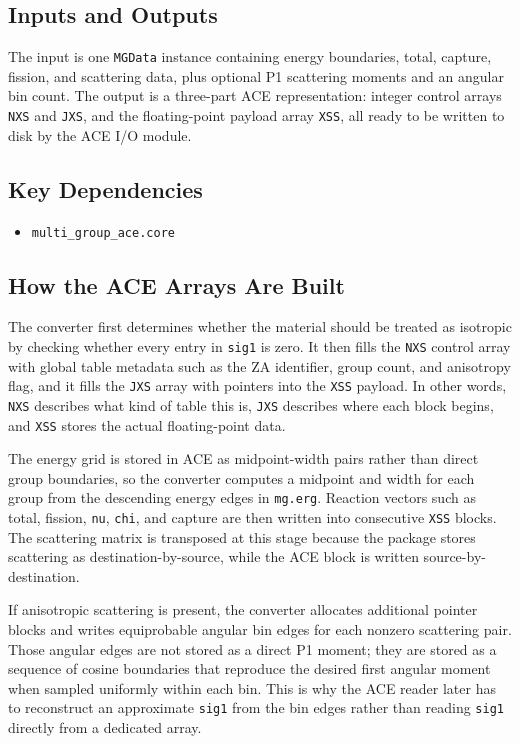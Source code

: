 \documentclass[11pt]{article}
\begin{document}
\subsection*{Inputs and Outputs}
The input is one \texttt{MGData} instance containing energy boundaries, total, capture, fission, and scattering data, plus optional P1 scattering moments and an angular bin count. The output is a three-part ACE representation: integer control arrays \texttt{NXS} and \texttt{JXS}, and the floating-point payload array \texttt{XSS}, all ready to be written to disk by the ACE I/O module.

\subsection*{Key Dependencies}
\begin{itemize}
\item \texttt{multi\_group\_ace.core}
\end{itemize}

\subsection*{How the ACE Arrays Are Built}
The converter first determines whether the material should be treated as isotropic by checking whether every entry in \texttt{sig1} is zero. It then fills the \texttt{NXS} control array with global table metadata such as the ZA identifier, group count, and anisotropy flag, and it fills the \texttt{JXS} array with pointers into the \texttt{XSS} payload. In other words, \texttt{NXS} describes what kind of table this is, \texttt{JXS} describes where each block begins, and \texttt{XSS} stores the actual floating-point data.

The energy grid is stored in ACE as midpoint-width pairs rather than direct group boundaries, so the converter computes a midpoint and width for each group from the descending energy edges in \texttt{mg.erg}. Reaction vectors such as total, fission, \texttt{nu}, \texttt{chi}, and capture are then written into consecutive \texttt{XSS} blocks. The scattering matrix is transposed at this stage because the package stores scattering as destination-by-source, while the ACE block is written source-by-destination.

If anisotropic scattering is present, the converter allocates additional pointer blocks and writes equiprobable angular bin edges for each nonzero scattering pair. Those angular edges are not stored as a direct P1 moment; they are stored as a sequence of cosine boundaries that reproduce the desired first angular moment when sampled uniformly within each bin. This is why the ACE reader later has to reconstruct an approximate \texttt{sig1} from the bin edges rather than reading \texttt{sig1} directly from a dedicated array.
\end{document}
